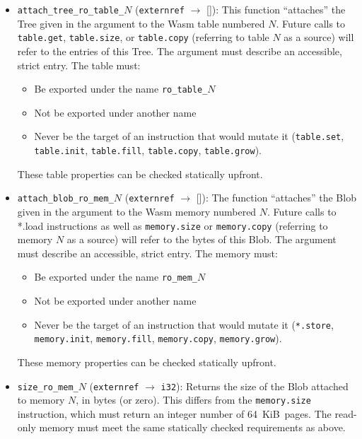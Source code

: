 \documentclass{article}
\newcommand{\blob}{\textrm{Blob}\xspace}
\newcommand{\tree}{\textrm{Tree}\xspace}
\begin{document}
\begin{itemize}
\item \texttt{attach\_tree\_ro\_table\_}$N$ (\texttt{externref}
  $\rightarrow$ []): This function ``attaches'' the \tree given in the
  argument to the Wasm table numbered $N$. Future calls to
  \texttt{table.get}, \texttt{table.size}, or \texttt{table.copy}
  (referring to table $N$ as a source) will refer to the entries of
  this \tree. The argument must describe an accessible, strict
  entry. The table must:
  \begin{itemize}[topsep=0pt, itemsep=0pt]
  \item Be exported under the name \texttt{ro\_table\_}$N$
  \item Not be exported under another name
  \item Never be the target of an instruction that would mutate it (\texttt{table.set},
    \texttt{table.init}, \texttt{table.fill}, \texttt{table.copy}, \texttt{table.grow}).
  \end{itemize}
  These table properties can be checked statically upfront.

\item \texttt{attach\_blob\_ro\_mem\_}$N$ (\texttt{externref} $\rightarrow$ []): The function ``attaches''
  the \blob given in the argument to the Wasm memory numbered $N$. Future calls to
  *.load instructions as well as \texttt{memory.size} or \texttt{memory.copy} (referring to memory $N$ as a source)
  will refer to the bytes of this \blob. The argument must describe an accessible, strict entry. The memory must:
    \begin{itemize}[topsep=0pt, itemsep=0pt]
  \item Be exported under the name \texttt{ro\_mem\_}$N$
  \item Not be exported under another name
  \item Never be the target of an instruction that would mutate it (\texttt{*.store},
    \texttt{memory.init}, \texttt{memory.fill}, \texttt{memory.copy}, \texttt{memory.grow}).
  \end{itemize}
  These memory properties can be checked statically upfront.

\item \texttt{size\_ro\_mem\_}$N$ (\texttt{externref} $\rightarrow$
  \texttt{i32}): Returns the size of the \blob attached to memory $N$,
  in bytes (or zero). This differs from the \texttt{memory.size}
  instruction, which must return an integer number of
  64~KiB~pages. The read-only memory must meet the same statically
  checked requirements as above.


\end{itemize}
\end{document}

